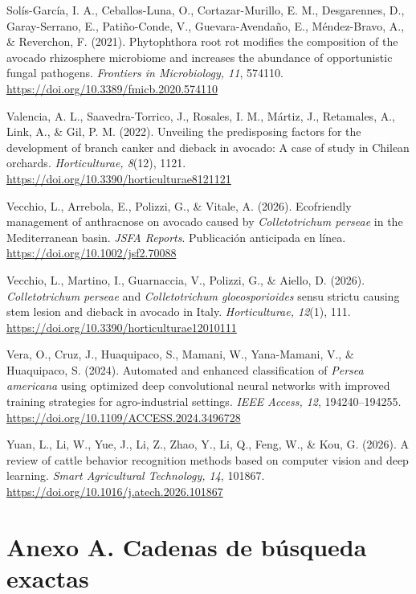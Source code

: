 \documentclass[11pt]{article}
\newcommand{\referencia}[1]{{\RaggedRight\hangindent=1.27cm\hangafter=1 #1\par}\vspace{-2pt}}
\begin{document}
\referencia{Solís-García, I. A., Ceballos-Luna, O., Cortazar-Murillo, E. M., Desgarennes, D., Garay-Serrano, E., Patiño-Conde, V., Guevara-Avendaño, E., Méndez-Bravo, A., \& Reverchon, F. (2021). Phytophthora root rot modifies the composition of the avocado rhizosphere microbiome and increases the abundance of opportunistic fungal pathogens. \textit{Frontiers in Microbiology, 11}, 574110. \url{https://doi.org/10.3389/fmicb.2020.574110}}

\referencia{Valencia, A. L., Saavedra-Torrico, J., Rosales, I. M., Mártiz, J., Retamales, A., Link, A., \& Gil, P. M. (2022). Unveiling the predisposing factors for the development of branch canker and dieback in avocado: A case of study in Chilean orchards. \textit{Horticulturae, 8}(12), 1121. \url{https://doi.org/10.3390/horticulturae8121121}}

\referencia{Vecchio, L., Arrebola, E., Polizzi, G., \& Vitale, A. (2026). Ecofriendly management of anthracnose on avocado caused by \textit{Colletotrichum perseae} in the Mediterranean basin. \textit{JSFA Reports}. Publicación anticipada en línea. \url{https://doi.org/10.1002/jsf2.70088}}

\referencia{Vecchio, L., Martino, I., Guarnaccia, V., Polizzi, G., \& Aiello, D. (2026). \textit{Colletotrichum perseae} and \textit{Colletotrichum gloeosporioides} sensu strictu causing stem lesion and dieback in avocado in Italy. \textit{Horticulturae, 12}(1), 111. \url{https://doi.org/10.3390/horticulturae12010111}}

\referencia{Vera, O., Cruz, J., Huaquipaco, S., Mamani, W., Yana-Mamani, V., \& Huaquipaco, S. (2024). Automated and enhanced classification of \textit{Persea americana} using optimized deep convolutional neural networks with improved training strategies for agro-industrial settings. \textit{IEEE Access, 12}, 194240–194255. \url{https://doi.org/10.1109/ACCESS.2024.3496728}}

\referencia{Yuan, L., Li, W., Yue, J., Li, Z., Zhao, Y., Li, Q., Feng, W., \& Kou, G. (2026). A review of cattle behavior recognition methods based on computer vision and deep learning. \textit{Smart Agricultural Technology, 14}, 101867. \url{https://doi.org/10.1016/j.atech.2026.101867}}

\newpage

\section*{Anexo A. Cadenas de búsqueda exactas}
\end{document}
